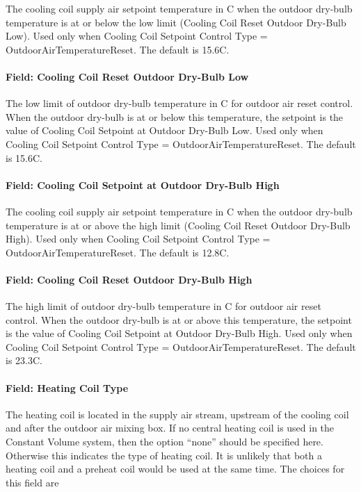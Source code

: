 The cooling coil supply air setpoint temperature in C when the outdoor dry-bulb temperature is at or below the low limit (Cooling Coil Reset Outdoor Dry-Bulb Low). Used only when Cooling Coil Setpoint Control Type = OutdoorAirTemperatureReset. The default is 15.6C.

\paragraph{Field: Cooling Coil Reset Outdoor Dry-Bulb Low}\label{field-cooling-coil-reset-outdoor-dry-bulb-low}

The low limit of outdoor dry-bulb temperature in C for outdoor air reset control. When the outdoor dry-bulb is at or below this temperature, the setpoint is the value of Cooling Coil Setpoint at Outdoor Dry-Bulb Low. Used only when Cooling Coil Setpoint Control Type = OutdoorAirTemperatureReset. The default is 15.6C.

\paragraph{Field: Cooling Coil Setpoint at Outdoor Dry-Bulb High}\label{field-cooling-coil-setpoint-at-outdoor-dry-bulb-high}

The cooling coil supply air setpoint temperature in C when the outdoor dry-bulb temperature is at or above the high limit (Cooling Coil Reset Outdoor Dry-Bulb High). Used only when Cooling Coil Setpoint Control Type = OutdoorAirTemperatureReset. The default is 12.8C.

\paragraph{Field: Cooling Coil Reset Outdoor Dry-Bulb High}\label{field-cooling-coil-reset-outdoor-dry-bulb-high}

The high limit of outdoor dry-bulb temperature in C for outdoor air reset control. When the outdoor dry-bulb is at or above this temperature, the setpoint is the value of Cooling Coil Setpoint at Outdoor Dry-Bulb High. Used only when Cooling Coil Setpoint Control Type = OutdoorAirTemperatureReset. The default is 23.3C.

\paragraph{Field: Heating Coil Type}\label{field-heating-coil-type-6}

The heating coil is located in the supply air stream, upstream of the cooling coil and after the outdoor air mixing box. If no central heating coil is used in the Constant Volume system, then the option ``none'' should be specified here. Otherwise this indicates the type of heating coil. It is unlikely that both a heating coil and a preheat coil would be used at the same time. The choices for this field are

